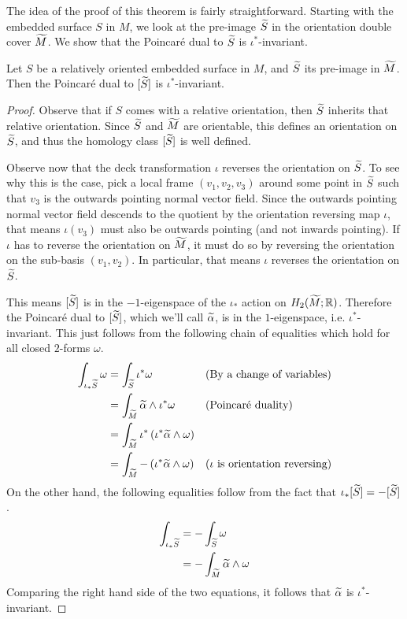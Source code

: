 The idea of the proof of this theorem is fairly straightforward. Starting with the embedded surface
$S$ in $M$, we look at the pre-image $\widetilde{S}$ in the orientation double cover $\widetilde{M}$. We show
that the Poincar\'e dual to $\widetilde{S}$ is $\iota^{\ast}$-invariant.
\begin{lem}
  \label{lem:PD1}
  Let $S$ be a relatively oriented embedded surface in $M$, and $\widetilde{S}$ its pre-image in
  $\widetilde{M}$. Then the Poincar\'e dual to $[\widetilde{S}]$ is $\iota^{\ast}$-invariant.
\end{lem}
\begin{proof}
  Observe that if $S$ comes with a relative orientation, then $\widetilde{S}$ inherits that relative
  orientation. Since $\widetilde{S}$ and $\widetilde{M}$ are orientable, this defines an orientation on $\widetilde{S}$,
  and thus the homology class $[\widetilde{S}]$ is well defined.

  Observe now that the deck transformation $\iota$ reverses the orientation on $\widetilde{S}$. To see why
  this is the case, pick a local frame $(v_1, v_2, v_3)$ around some point in $\widetilde{S}$ such that
  $v_3$ is the outwards pointing normal vector field. Since the outwards pointing normal vector
  field descends to the quotient by the orientation reversing map $\iota$, that means $\iota(v_3)$
  must also be outwards pointing (and not inwards pointing). If $\iota$ has to reverse the
  orientation on $\widetilde{M}$, it must do so by reversing the orientation on the sub-basis
  $(v_1, v_2)$. In particular, that means $\iota$ reverses the orientation on $\widetilde{S}$.

  This means $[\widetilde{S}]$ is in the $-1$-eigenspace of the $\iota_{\ast}$ action on
  $H_2(\widetilde{M}; \mathbb{R})$. Therefore the Poincar\'e dual to $[\widetilde{S}]$, which we'll call
  $\widetilde{\alpha}$, is in the $1$-eigenspace, i.e. $\iota^{\ast}$-invariant. This just follows from
  the following chain of equalities which hold for all closed $2$-forms $\omega$.
  \begin{align*}
    \int_{\iota_{\ast}\widetilde{S}} \omega &= \int_{\widetilde{S}} \iota^{\ast}\omega &&\text{(By a change of variables)} \\
                                     &= \int_{\widetilde{M}} \widetilde{\alpha} \wedge \iota^{\ast} \omega &&\text{(Poincar\'e duality)} \\
                                     &=\int_{\widetilde{M}} \iota^{\ast} \left( \iota^{\ast}\widetilde{\alpha} \wedge \omega \right) \\
    &= \int_{\widetilde{M}} - \left( \iota^{\ast} \widetilde{\alpha} \wedge \omega \right) &&\text{($\iota$ is orientation reversing)}
  \end{align*}
  On the other hand, the following equalities follow from the fact that
  $\iota_{\ast}[\widetilde{S}] = -[\widetilde{S}]$.
  \begin{align*}
    \int_{\iota_{\ast}\widetilde{S}} &= - \int_{\widetilde{S}} \omega \\
                              &= - \int_{\widetilde{M}} \widetilde{\alpha} \wedge \omega
  \end{align*}
  Comparing the right hand side of the two equations, it follows that $\widetilde{\alpha}$ is
  $\iota^{\ast}$-invariant.
\end{proof}

